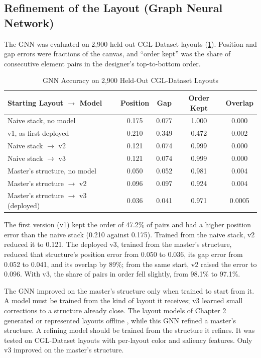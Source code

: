 \begin{refsection}
\clearpage
\subsection{Refinement of the Layout (Graph Neural Network)}

The GNN was evaluated on 2,900 held-out CGL-Dataset layouts (\ref{tab:gnn-heldout}). Position and gap errors were fractions of the canvas, and ``order kept'' was the share of consecutive element pairs in the designer's top-to-bottom order.

\begin{table}[!ht]
\centering
\caption{GNN Accuracy on 2,900 Held-Out CGL-Dataset Layouts}
\label{tab:gnn-heldout}
\begin{tabular}{l c c c c}
\hline
\textbf{Starting Layout $\rightarrow$ Model} & \textbf{Position} & \textbf{Gap} & \textbf{Order Kept} & \textbf{Overlap} \\ \hline
Naive stack, no model & 0.175 & 0.077 & 1.000 & 0.000 \\
v1, as first deployed & 0.210 & 0.349 & 0.472 & 0.002 \\
Naive stack $\rightarrow$ v2 & 0.121 & 0.074 & 0.999 & 0.000 \\
Naive stack $\rightarrow$ v3 & 0.121 & 0.074 & 0.999 & 0.000 \\ \hline
Master's structure, no model & 0.050 & 0.052 & 0.981 & 0.004 \\
Master's structure $\rightarrow$ v2 & 0.096 & 0.097 & 0.924 & 0.004 \\
Master's structure $\rightarrow$ v3 (deployed) & 0.036 & 0.041 & 0.971 & 0.0005 \\ \hline
\end{tabular}
\end{table}

The first version (v1) kept the order of 47.2\% of pairs and had a higher position error than the naive stack (0.210 against 0.175). Trained from the naive stack, v2 reduced it to 0.121. The deployed v3, trained from the master's structure, reduced that structure's position error from 0.050 to 0.036, its gap error from 0.052 to 0.041, and its overlap by 89\%; from the same start, v2 raised the error to 0.096. With v3, the share of pairs in order fell slightly, from 98.1\% to 97.1\%.

The GNN improved on the master's structure only when trained to start from it. A model must be trained from the kind of layout it receives; v3 learned small corrections to a structure already close. The layout models of Chapter 2 generated or represented layouts offline \cite{Lee2020Neural, Jiang2024Graph4GUI}, while this GNN refined a master's structure. A refining model should be trained from the structure it refines. It was tested on CGL-Dataset layouts with per-layout color and saliency features. Only v3 improved on the master's structure.


\end{refsection}
